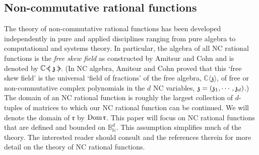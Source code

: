 \documentclass{article}
\theoremstyle{definition}
\theoremstyle{remark}
\numberwithin{equation}{section}
\newcommand{\mr}{\ensuremath{\mathrm}}
\newcommand{\mf}{\ensuremath{\mathfrak}}
\def\C{\mathbb{C}}
\def\N{\mathbb{N}}
\def\B{\mathbb{B}}
\def\fr{\mathfrak{r}}
\def\fp{\mathbb{C} \langle \mathbb{\mathfrak{z}} \rangle }
\def\nbdom{\mr{Dom} \, }
\def\fskew{\C \ \mathclap{\, <}{\left( \right.} \,  \mf{z} \, \mathclap{ \, \, \, \, >}{\left. \right)} }
\begin{document}
\subsection{Non-commutative rational functions} \label{subsec:ncrat}

The theory of non-commutative rational functions has been developed independently in pure and applied disciplines ranging from pure algebra to computational and systems theory. In particular, the algebra of all NC rational functions is the \emph{free skew field} as constructed by Amitsur \cite{Amitsur} and Cohn \cite{Cohn} and is denoted by $\fskew$. (In NC algebra, Amitsur and Cohn proved that this `free skew field' is the universal `field of fractions' of the free algebra, $\fp$, of free or non-commutative complex polynomials in the $d$ NC variables, $\mf{z} = ( \mf{z} _1, \cdots , \mf{z} _d )$.) The domain of an NC rational function is roughly the largest collection of $d$-tuples of matrices to which our NC rational function can be continued. We will denote the domain of $\fr$ by $\nbdom \fr$. This paper will focus on NC rational functions that are defined and bounded on $\B ^d _{\N}$. This assumption simplifies much of the theory. The interested reader should consult \cite{KVV-ncrat,KVV-ncratdiff,Volcic} and the references therein for more detail on the theory of NC rational functions.  
\end{document}
